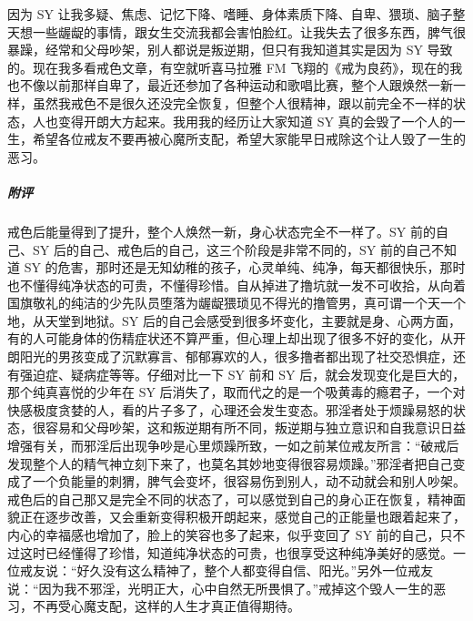 \begin{case}
    因为 SY 让我多疑、焦虑、记忆下降、嗜睡、身体素质下降、自卑、猥琐、脑子整天想一些龌龊的事情，跟女生交流我都会害怕脸红。让我失去了很多东西，脾气很暴躁，经常和父母吵架，别人都说是叛逆期，但只有我知道其实是因为 SY 导致的。现在我多看戒色文章，有空就听喜马拉雅 FM 飞翔的《戒为良药》，现在的我也不像以前那样自卑了，最近还参加了各种运动和歌唱比赛，整个人跟焕然一新一样，虽然我戒色不是很久还没完全恢复，但整个人很精神，跟以前完全不一样的状态，人也变得开朗大方起来。我用我的经历让大家知道 SY 真的会毁了一个人的一生，希望各位戒友不要再被心魔所支配，希望大家能早日戒除这个让人毁了一生的恶习。
    \subparagraph{附评} 戒色后能量得到了提升，整个人焕然一新，身心状态完全不一样了。SY 前的自己、SY 后的自己、戒色后的自己，这三个阶段是非常不同的，SY 前的自己不知道 SY 的危害，那时还是无知幼稚的孩子，心灵单纯、纯净，每天都很快乐，那时也不懂得纯净状态的可贵，不懂得珍惜。自从掉进了撸坑就一发不可收拾，从向着国旗敬礼的纯洁的少先队员堕落为龌龊猥琐见不得光的撸管男，真可谓一个天一个地，从天堂到地狱。SY 后的自己会感受到很多坏变化，主要就是身、心两方面，有的人可能身体的伤精症状还不算严重，但心理上却出现了很多不好的变化，从开朗阳光的男孩变成了沉默寡言、郁郁寡欢的人，很多撸者都出现了社交恐惧症，还有强迫症、疑病症等等。仔细对比一下 SY 前和 SY 后，就会发现变化是巨大的，那个纯真喜悦的少年在 SY 后消失了，取而代之的是一个吸黄毒的瘾君子，一个对快感极度贪婪的人，看的片子多了，心理还会发生变态。邪淫者处于烦躁易怒的状态，很容易和父母吵架，这和叛逆期有所不同，叛逆期与独立意识和自我意识日益增强有关，而邪淫后出现争吵是心里烦躁所致，一如之前某位戒友所言：“破戒后发现整个人的精气神立刻下来了，也莫名其妙地变得很容易烦躁。”邪淫者把自己变成了一个负能量的刺猬，脾气会变坏，很容易伤到别人，动不动就会和别人吵架。戒色后的自己那又是完全不同的状态了，可以感觉到自己的身心正在恢复，精神面貌正在逐步改善，又会重新变得积极开朗起来，感觉自己的正能量也跟着起来了，内心的幸福感也增加了，脸上的笑容也多了起来，似乎变回了 SY 前的自己，只不过这时已经懂得了珍惜，知道纯净状态的可贵，也很享受这种纯净美好的感觉。一位戒友说：“好久没有这么精神了，整个人都变得自信、阳光。”另外一位戒友说：“因为我不邪淫，光明正大，心中自然无所畏惧了。”戒掉这个毁人一生的恶习，不再受心魔支配，这样的人生才真正值得期待。
\end{case}

